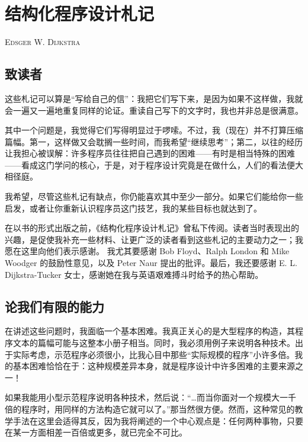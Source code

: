 \chapter{结构化程序设计札记}

{
	\noindent
	\scshape\hfill\scriptsize Edsger W. Dijkstra\hfill
}
\renewcommand{\leftmark}{\normalfont\scriptsize\hfill E. W. DIJKSTRA\hfill}
\medskip

\section[致读者]{致读者}

这些札记可以算是“写给自己的信”：我把它们写下来，是因为如果不这样做，我就会一遍又一遍地重复同样的论证。重读自己写下的文字时，我也并非总是很满意。

其中一个问题是，我觉得它们写得明显过于啰嗦。不过，我（现在）并不打算压缩篇幅。第一，这样做又会耽搁一些时间，而我希望“继续思考”；第二，以往的经历让我担心被误解：许多程序员往往把自己遇到的困难——有时是相当特殊的困难——看成这门学问的核心，于是，对于程序设计究竟是在做什么，人们的看法便大相径庭。

我希望，尽管这些札记有缺点，你仍能喜欢其中至少一部分。如果它们能给你一些启发，或者让你重新认识程序员这门技艺，我的某些目标也就达到了。

在以书的形式出版之前，《结构化程序设计札记》曾私下传阅。读者当时表现出的兴趣，是促使我补充一些材料、让更广泛的读者看到这些札记的主要动力之一；我愿在这里向他们表示感谢。
我尤其要感谢 Bob Floyd、Ralph London 和 Mike Woodger 的鼓励性意见，以及 Peter Naur 提出的批评。最后，我还要感谢 E. L. Dijkstra-Tucker 女士，感谢她在我与英语艰难搏斗时给予的热心帮助。

\section[论我们有限的能力]{论我们有限的能力}
\label{sec:our-inability-to-do-much}

在讲述这些问题时，我面临一个基本困难。我真正关心的是大型程序的构造，其程序文本的篇幅可能与这整本小册子相当。同时，我必须用例子来说明各种技术。出于实际考虑，示范程序必须很小，比我心目中那些“实际规模的程序”小许多倍。我的基本困难恰恰在于：这种规模差异本身，就是程序设计中许多困难的主要来源之一！

如果我能用小型示范程序说明各种技术，然后说：“\dots 而当你面对一个规模大一千倍的程序时，用同样的方法构造它就可以了。”那当然很方便。然而，这种常见的教学手法在这里会适得其反，因为我将阐述的一个中心观点是：任何两种事物，只要在某一方面相差一百倍或更多，就已完全不可比。

